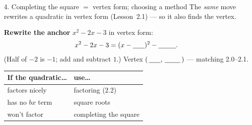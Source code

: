 \documentclass[10pt]{article}
\newcommand{\lgrid}[4]{%
  \draw[step=1, linegray!40, very thin] (#1,#3) grid (#2,#4);
  \draw[->, semithick, charcoal] (#1,0)--(#2,0) node[below right, font=\scriptsize]{$x$};
  \draw[->, semithick, charcoal] (0,#3)--(0,#4) node[left, font=\scriptsize]{$y$};}
\begin{document}
\begin{notesbox}{4. Completing the square $=$ vertex form; choosing a method}
The \emph{same} move rewrites a quadratic in vertex form (Lesson~2.1) --- so it also finds the vertex.
\begin{center}
\begin{minipage}{0.56\linewidth}
\textbf{Rewrite the anchor} $x^2-2x-3$ in vertex form:
\[ x^2-2x-3=(x-\blank{0.6cm})^2-\blank{0.9cm}. \]
(Half of $-2$ is $-1$; add and subtract $1$.) Vertex $(\,\blank{0.6cm},\,\blank{0.8cm}\,)$ --- matching 2.0--2.1.

\vspace{4pt}
\renewcommand{\arraystretch}{1.3}
\begin{tabular}{|l|l|}
\hline
\textbf{If the quadratic\dots} & \textbf{use\dots} \\ \hline
factors nicely & factoring (2.2) \\ \hline
has no $bx$ term & square roots \\ \hline
won't factor & completing the square \\ \hline
\end{tabular}
\end{minipage}%
\begin{minipage}{0.42\linewidth}\centering
{}
\end{minipage}
\end{center}
\end{notesbox}
\end{document}
